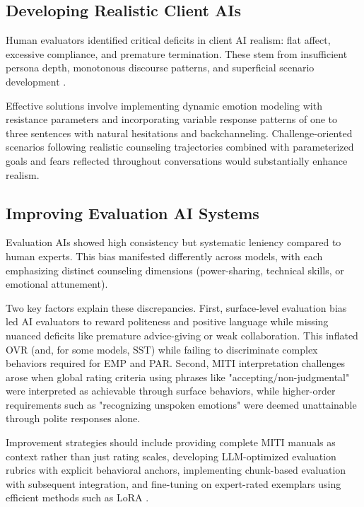\documentclass{wiley-article}
\begin{document}
\subsection*{Developing Realistic Client AIs}

Human evaluators identified critical deficits in client AI realism: flat affect, excessive compliance, and premature termination. These stem from insufficient persona depth, monotonous discourse patterns, and superficial scenario development \citep{mauryaQualitativeContentAnalysis2024, qiuInteractiveAgentsSimulating2024}.

Effective solutions involve implementing dynamic emotion modeling with resistance parameters \citep{baoSFMSSServiceFlow2025} and incorporating variable response patterns of one to three sentences with natural hesitations and backchanneling. Challenge-oriented scenarios following realistic counseling trajectories \citep{duLLMsCanSimulate2024} combined with parameterized goals and fears reflected throughout conversations \citep{cookVirtualPatientsUsing2025} would substantially enhance realism.

\subsection*{Improving Evaluation AI Systems}

Evaluation AIs showed high consistency but systematic leniency compared to human experts. This bias manifested differently across models, with each emphasizing distinct counseling dimensions (power-sharing, technical skills, or emotional attunement).

Two key factors explain these discrepancies. First, surface-level evaluation bias led AI evaluators to reward politeness and positive language while missing nuanced deficits like premature advice-giving or weak collaboration. This inflated OVR (and, for some models, SST) while failing to discriminate complex behaviors required for EMP and PAR. Second, MITI interpretation challenges arose when global rating criteria using phrases like "accepting/non-judgmental" were interpreted as achievable through surface behaviors, while higher-order requirements such as "recognizing unspoken emotions" were deemed unattainable through polite responses alone.

Improvement strategies should include providing complete MITI manuals as context rather than just rating scales, developing LLM-optimized evaluation rubrics with explicit behavioral anchors, implementing chunk-based evaluation with subsequent integration, and fine-tuning on expert-rated exemplars using efficient methods such as LoRA \citep{zhangPLaDPreferencebasedLarge2024}.
\end{document}
